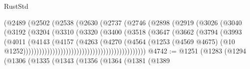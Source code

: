 \begin{lexlean}{RustStd}
\begin{coremodule}
                                        (@2489
                                          (@2502
                                            (@2538
                                              (@2630
                                                (@2737
                                                  (@2746
                                                    (@2898
                                                      (@2919
                                                        (@3026
                                                          (@3040
                                                            (@3192
                                                              (@3204
                                                                (@3310
                                                                  (@3320
                                                                    (@3400
                                                                      (@3518
                                                                        (@3647
                                                                          (@3662
                                                                            (@3794
                                                                              (@3993
                                                                                (@4011
                                                                                  (@4143
                                                                                    (@4157
                                                                                      (@4263
                                                                                        (@4270
                                                                                          (@4564
                                                                                            (@1253
                                                                                              (@4569
                                                                                                @4675)
                                                                                              (@10
                                                                                                @1252))))))))))))))))))))))))))))))))))))))))))))))
@4742 := @1251
    (@1283
      (@1294
        (@1306
          (@1335
            (@1343
              (@1356
                (@1364
                  (@1381
                    (@1389

\end{coremodule}
\end{lexlean}
